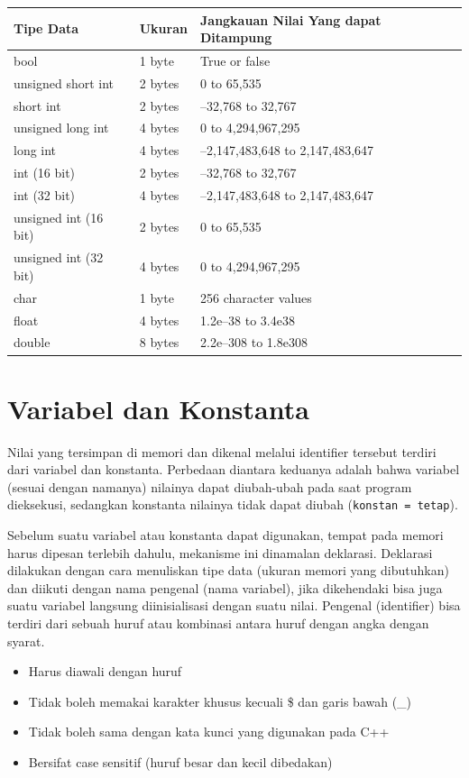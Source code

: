 \begin{longtable}[]{@{}lll@{}}
\toprule
Tipe Data & Ukuran & Jangkauan Nilai Yang dapat Ditampung\tabularnewline
\midrule
\endhead
bool & 1 byte & True or false\tabularnewline
unsigned short int & 2 bytes & 0 to 65,535\tabularnewline
short int & 2 bytes & --32,768 to 32,767\tabularnewline
unsigned long int & 4 bytes & 0 to 4,294,967,295\tabularnewline
long int & 4 bytes & --2,147,483,648 to 2,147,483,647\tabularnewline
int (16 bit) & 2 bytes & --32,768 to 32,767\tabularnewline
int (32 bit) & 4 bytes & --2,147,483,648 to 2,147,483,647\tabularnewline
unsigned int (16 bit) & 2 bytes & 0 to 65,535\tabularnewline
unsigned int (32 bit) & 4 bytes & 0 to 4,294,967,295\tabularnewline
char & 1 byte & 256 character values\tabularnewline
float & 4 bytes & 1.2e--38 to 3.4e38\tabularnewline
double & 8 bytes & 2.2e--308 to 1.8e308\tabularnewline
\bottomrule
\end{longtable}

\section{Variabel dan Konstanta}\label{variabel-dan-konstanta}

Nilai yang tersimpan di memori dan dikenal melalui identifier tersebut
terdiri dari variabel dan konstanta. Perbedaan diantara keduanya adalah
bahwa variabel (sesuai dengan namanya) nilainya dapat diubah-ubah pada
saat program dieksekusi, sedangkan konstanta nilainya tidak dapat diubah
(\texttt{konstan\ =\ tetap}).

Sebelum suatu variabel atau konstanta dapat digunakan, tempat pada
memori harus dipesan terlebih dahulu, mekanisme ini dinamalan deklarasi.
Deklarasi dilakukan dengan cara menuliskan tipe data (ukuran memori yang
dibutuhkan) dan diikuti dengan nama pengenal (nama variabel), jika
dikehendaki bisa juga suatu variabel langsung diinisialisasi dengan
suatu nilai. Pengenal (identifier) bisa terdiri dari sebuah huruf atau
kombinasi antara huruf dengan angka dengan syarat.

\begin{itemize}
\tightlist
\item
  Harus diawali dengan huruf
\item
  Tidak boleh memakai karakter khusus kecuali \$ dan garis bawah (\_)
\item
  Tidak boleh sama dengan kata kunci yang digunakan pada C++
\item
  Bersifat case sensitif (huruf besar dan kecil dibedakan)
\end{itemize}

